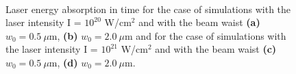 \begin{figure}[h!]
	\centering
	\\
	\caption{Laser energy absorption in time for the case of simulations with the laser intensity I = $ 10^{20} $ W/cm$^2$ and with the beam waist \textbf{(a)} $ w_0 = 0.5 \ \mu\mathrm{m} $, \textbf{(b)} $ w_0 = 2.0 \ \mu\mathrm{m} $ and for the case of simulations with the laser intensity I = $ 10^{21} $ W/cm$^2$ and with the beam waist \textbf{(c)} $ w_0 = 0.5 \ \mu\mathrm{m} $, \textbf{(d)} $ w_0 = 2.0 \ \mu\mathrm{m} $.}
	\label{fig:10}
\end{figure}


